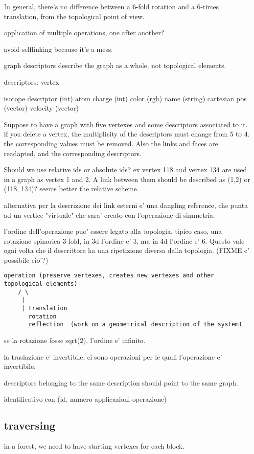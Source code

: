 In general, there's no difference between a 6-fold rotation and a 6-times
translation, from the topological point of view.

application of multiple operations, one after another?

avoid selflinking because it's a mess.

graph descriptors describe the graph as a whole, not topological elements.


descriptors: vertex

isotope descriptor (int)
atom charge (int)
color (rgb)
name (string)
cartesian pos (vector)
velocity (vector)


Suppose to have a graph with five vertexes and some descriptors associated
to it. if you delete a vertex, the multiplicity of the descriptors must
change from 5 to 4. the corresponding values must be removed. Also the links
and faces are readapted, and the corresponding descriptors.

Should we use relative ids or absolute ids? ex vertex 118 and vertex 134 are
used in a graph as vertex 1 and 2. A link between them should be described
as (1,2) or (118, 134)? seems better the relative scheme.

alternativa per la descrizione dei link esterni e' una dangling reference,
che punta ad un vertice "virtuale" che sara' creato con l'operazione di
simmetria.

l'ordine dell'operazione puo' essere legato alla topologia, tipico caso, una
rotazione spinorica 3-fold, in 3d l'ordine e' 3, ma in 4d l'ordine e' 6.
Questo vale ogni volta che il descrittore ha una ripetizione diversa dalla
topologia. (FIXME e' possibile cio'?)

\begin{verbatim}
operation (preserve vertexes, creates new vertexes and other topological elements)
    / \
     |
     | translation
       rotation
       reflection  (work on a geometrical description of the system)

\end{verbatim}

se la rotazione fosse sqrt(2), l'ordine e' infinito. 

la traslazione e' invertibile, ci sono operazioni per le quali l'operazione
e' invertibile.

descriptors belonging to the same description should point to the same
graph.

identificativo con (id, numero applicazioni operazione)


\subsection{traversing}
in a forest, we need to have starting vertexes for each block.


